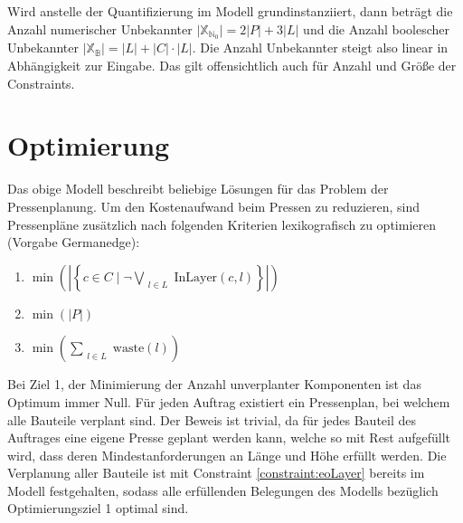 Wird anstelle der Quantifizierung im Modell grundinstanziiert, dann beträgt die Anzahl numerischer Unbekannter
$\lvert \mathbb{X}_{\mathbb{N}_0} \rvert = 2 \lvert P \rvert + 3 \lvert L \rvert$ und die Anzahl boolescher Unbekannter
$\lvert \mathbb{X}_{\mathbb{B}} \rvert = \lvert L \rvert + \lvert C \rvert \cdot \lvert L \rvert$.
Die Anzahl Unbekannter steigt also linear in Abhängigkeit zur Eingabe.
Das gilt offensichtlich auch für Anzahl und Größe der Constraints.

\section{Optimierung}
\label{sec:optimierung}
Das obige Modell beschreibt beliebige Lösungen für das Problem der Pressenplanung.
Um den Kostenaufwand beim Pressen zu reduzieren, sind Pressenpläne zusätzlich nach folgenden Kriterien lexikografisch zu optimieren (Vorgabe Germanedge):
\begin{enumerate}
    \item $ \min \left( \left\lvert \left\{ c \in C \mid \neg\bigvee\limits_{\substack{l \in L}} \text{InLayer}(c,l) \right\} \right\rvert \right) $
    \item $ \min (\lvert P \rvert) $
    \item $ \min \left(\sum\limits_{\substack{l \in L}} \text{waste}(l) \right) $
\end{enumerate}

Bei Ziel 1, der Minimierung der Anzahl unverplanter Komponenten ist das Optimum immer Null.
Für jeden Auftrag existiert ein Pressenplan, bei welchem alle Bauteile verplant sind.
Der Beweis ist trivial, da für jedes Bauteil des Auftrages eine eigene Presse geplant werden kann, welche so mit Rest aufgefüllt wird,
dass deren Mindestanforderungen an Länge und Höhe erfüllt werden.
Die Verplanung aller Bauteile ist mit Constraint \ref{constraint:eoLayer} bereits im Modell festgehalten, sodass alle erfüllenden Belegungen des Modells
bezüglich Optimierungsziel 1 optimal sind.
